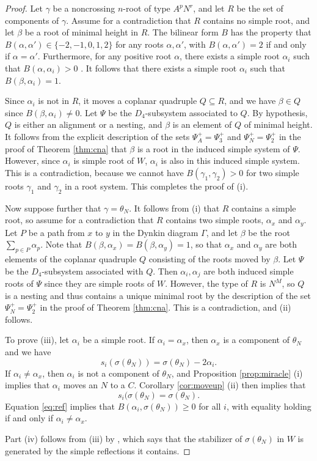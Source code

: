 \documentclass[11pt]{amsart}
\theoremstyle{plain}
\theoremstyle{definition}
\theoremstyle{remark}
\numberwithin{equation}{subsection}
\newcommand{\al}{\alpha}
\newcommand{\be}{\beta}
\newcommand{\coplanar}{coplanar\xspace}
\newcommand{\se}{\subseteq}
\begin{document}
\begin{proof}
Let $\gamma$ be a noncrossing $n$-root of type $A^pN^r$, and let $R$ be the set
of components of $\gamma$. Assume for a contradiction that $R$ contains no
simple root, and let $\be$ be a root of minimal height in $R$. The bilinear form
$B$ has the property that $B(\al,\al')\in \{-2,-1,0,1,2\}$ for any roots
$\al,\al'$, with $B(\al,\al')=2$ if and only if $\al=\al'$.  Furthermore, for
any positive root $\al$, there exists a simple root $\al_i$ such that
$B(\al,\al_i)>0$ \cite[Theorem 1.5]{humphreys90}. It follows that there exists a
simple root $\al_i$ such that $B(\be, \al_i) = 1$.

Since $\al_i$ is not in $R$, it moves a coplanar quadruple $Q\se R$, and we have
$\be\in Q$ since $B(\beta,\al_i)\neq 0$. Let $\Psi$ be the $D_4$-subsystem
associated to $Q$.  By hypothesis, $Q$ is either an alignment or a nesting, and
$\be$ is an element of $Q$ of minimal height. It follows from the explicit
description of the sets $\Psi^+_A=\Psi^+_3$ and $\Psi^+_N=\Psi^+_2$ in the proof
of Theorem \ref{thm:cna} that $\be$ is a root in the induced simple system of
$\Psi$. However, since $\al_i$ is simple root of $W$, $\al_i$ is also
in this induced simple system.  This is a contradiction, because we cannot have
$B(\gamma_1, \gamma_2) > 0$ for two simple roots $\gamma_1$ and $\gamma_2$ in a
root system. This completes the proof of (i).

Now suppose further that $\gamma=\theta_N$. It follows from (i) that $R$
contains a simple root, so assume for a contradiction that $R$ contains two
simple roots, $\al_x$ and $\al_y$.  Let $P$ be a path from $x$ to $y$ in the
Dynkin diagram $\Gamma$, and let $\be$ be the root $\sum_{p \in P} \al_p$. Note
that $B(\be, \al_x) = B(\be, \al_y) = 1$, so that $\al_x$ and $\al_y$ are both
elements of the \coplanar quadruple $Q$ consisting of the roots moved by $\be$.
Let $\Psi$ be the $D_4$-subsystem associated with $Q$. Then $\al_i,\al_j$ are
both induced simple roots of $\Psi$ since they are simple roots of $W$. However,
the type of $R$ is $N^M$, so $Q$ is a nesting and thus contains a unique minimal
root by the description of the set $\Psi^+_N=\Psi^+_2$ in the proof of Theorem
\ref{thm:cna}.  This is a contradiction, and (ii) follows.

To prove (iii), let ${\al_i}$ be a simple root. If $\al_i = \al_x$, then $\al_x$
is a component of $\theta_N$ and we have $$ s_{i}(\sigma(\theta_N)) =
\sigma(\theta_N) - 2\al_i .$$ If $\al_i \ne \al_x$, then $\al_i$ is not a
component of $\theta_N$, and Proposition \ref{prop:miracle} (i) implies that
$\al_i$ moves an $N$ to a $C$. Corollary \ref{cor:moveup} (ii) then implies that
$$ s_{i}(\sigma(\theta_N) = \sigma(\theta_N) .$$ Equation \ref{eq:ref} implies
    that  $B(\al_i, \sigma(\theta_N))\ge 0$ for all $i$, with equality holding
    if and only if $\al_i\neq \al_x$.

Part (iv) follows from (iii) by \cite[Theorem 1.12 (a)]{humphreys90}, which says
that the stabilizer of $\sigma(\theta_N)$ in $W$ is generated by the simple
reflections it contains.
\end{proof}
\end{document}
